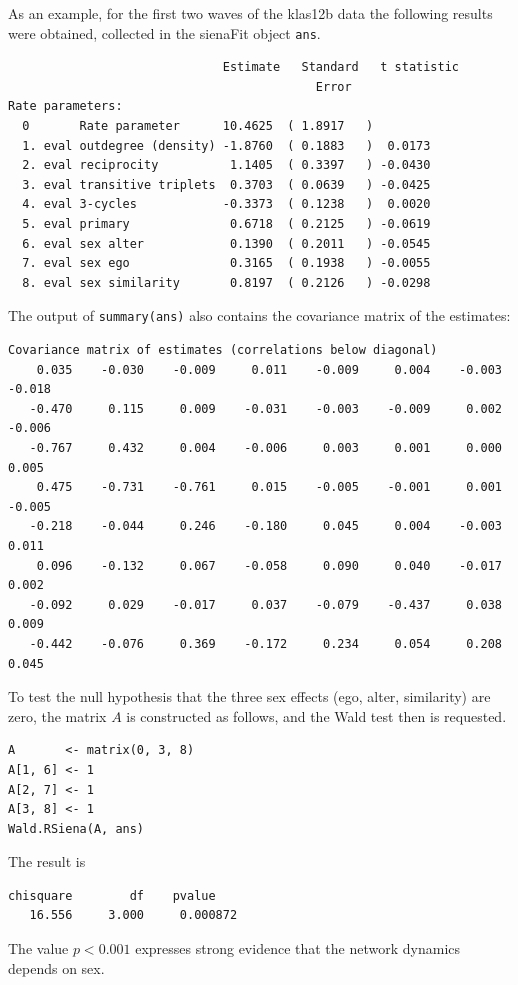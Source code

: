 \documentclass[a4paper,fleqn,11pt]{article}
\newcommand{\+}{\, + \,}
\begin{document}
As an example, for the first two waves of the \textsf{klas12b} data
the following results were obtained,
collected in the \textsf{sienaFit} object \texttt{ans}.
\begin{small}
\begin{verbatim}
                              Estimate   Standard   t statistic
                                           Error
Rate parameters:
  0       Rate parameter      10.4625  ( 1.8917   )
  1. eval outdegree (density) -1.8760  ( 0.1883   )  0.0173
  2. eval reciprocity          1.1405  ( 0.3397   ) -0.0430
  3. eval transitive triplets  0.3703  ( 0.0639   ) -0.0425
  4. eval 3-cycles            -0.3373  ( 0.1238   )  0.0020
  5. eval primary              0.6718  ( 0.2125   ) -0.0619
  6. eval sex alter            0.1390  ( 0.2011   ) -0.0545
  7. eval sex ego              0.3165  ( 0.1938   ) -0.0055
  8. eval sex similarity       0.8197  ( 0.2126   ) -0.0298
\end{verbatim}
\end{small}
The output of \texttt{summary(ans)} also contains the
covariance matrix of the estimates:
\begin{footnotesize}
\begin{verbatim}
Covariance matrix of estimates (correlations below diagonal)
    0.035    -0.030    -0.009     0.011    -0.009     0.004    -0.003    -0.018
   -0.470     0.115     0.009    -0.031    -0.003    -0.009     0.002    -0.006
   -0.767     0.432     0.004    -0.006     0.003     0.001     0.000     0.005
    0.475    -0.731    -0.761     0.015    -0.005    -0.001     0.001    -0.005
   -0.218    -0.044     0.246    -0.180     0.045     0.004    -0.003     0.011
    0.096    -0.132     0.067    -0.058     0.090     0.040    -0.017     0.002
   -0.092     0.029    -0.017     0.037    -0.079    -0.437     0.038     0.009
   -0.442    -0.076     0.369    -0.172     0.234     0.054     0.208     0.045
\end{verbatim}
\end{footnotesize}
To test the null hypothesis that the three sex effects
(ego, alter, similarity) are zero,
the matrix $A$ is constructed as follows, and the Wald test then is requested.
\begin{small}
\begin{verbatim}
A       <- matrix(0, 3, 8)
A[1, 6] <- 1
A[2, 7] <- 1
A[3, 8] <- 1
Wald.RSiena(A, ans)
\end{verbatim}
\end{small}
The result is
\begin{small}
\begin{verbatim}
chisquare        df    pvalue
   16.556     3.000     0.000872
\end{verbatim}
\end{small}
The value $p < 0.001$ expresses strong evidence
that the network dynamics depends on sex.
\bigskip
\end{document}
